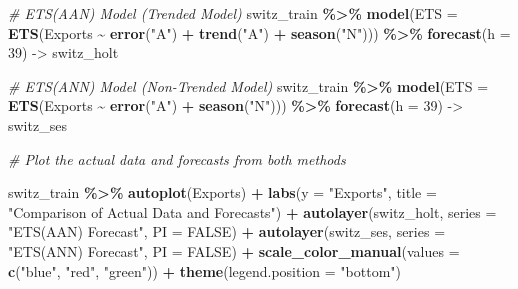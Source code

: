 \documentclass[
]{article}
\newenvironment{Shaded}{\begin{snugshade}}{\end{snugshade}}
\newcommand{\AttributeTok}[1]{\textcolor[rgb]{0.13,0.29,0.53}{#1}}
\newcommand{\CommentTok}[1]{\textcolor[rgb]{0.56,0.35,0.01}{\textit{#1}}}
\newcommand{\ConstantTok}[1]{\textcolor[rgb]{0.56,0.35,0.01}{#1}}
\newcommand{\DecValTok}[1]{\textcolor[rgb]{0.00,0.00,0.81}{#1}}
\newcommand{\FunctionTok}[1]{\textcolor[rgb]{0.13,0.29,0.53}{\textbf{#1}}}
\newcommand{\NormalTok}[1]{#1}
\newcommand{\OtherTok}[1]{\textcolor[rgb]{0.56,0.35,0.01}{#1}}
\newcommand{\SpecialCharTok}[1]{\textcolor[rgb]{0.81,0.36,0.00}{\textbf{#1}}}
\newcommand{\StringTok}[1]{\textcolor[rgb]{0.31,0.60,0.02}{#1}}
\begin{document}
\begin{Shaded}
\begin{Highlighting}[]
\CommentTok{\# ETS(AAN) Model (Trended Model)}
\NormalTok{switz\_train }\SpecialCharTok{\%\textgreater{}\%}
  \FunctionTok{model}\NormalTok{(}\AttributeTok{ETS =} \FunctionTok{ETS}\NormalTok{(Exports }\SpecialCharTok{\textasciitilde{}} \FunctionTok{error}\NormalTok{(}\StringTok{"A"}\NormalTok{) }\SpecialCharTok{+} \FunctionTok{trend}\NormalTok{(}\StringTok{"A"}\NormalTok{) }\SpecialCharTok{+} \FunctionTok{season}\NormalTok{(}\StringTok{"N"}\NormalTok{))) }\SpecialCharTok{\%\textgreater{}\%}
  \FunctionTok{forecast}\NormalTok{(}\AttributeTok{h =} \DecValTok{39}\NormalTok{) }\OtherTok{{-}\textgreater{}}\NormalTok{ switz\_holt}

\CommentTok{\# ETS(ANN) Model (Non{-}Trended Model)}
\NormalTok{switz\_train }\SpecialCharTok{\%\textgreater{}\%}
  \FunctionTok{model}\NormalTok{(}\AttributeTok{ETS =} \FunctionTok{ETS}\NormalTok{(Exports }\SpecialCharTok{\textasciitilde{}} \FunctionTok{error}\NormalTok{(}\StringTok{"A"}\NormalTok{) }\SpecialCharTok{+} \FunctionTok{season}\NormalTok{(}\StringTok{"N"}\NormalTok{))) }\SpecialCharTok{\%\textgreater{}\%}
  \FunctionTok{forecast}\NormalTok{(}\AttributeTok{h =} \DecValTok{39}\NormalTok{) }\OtherTok{{-}\textgreater{}}\NormalTok{ switz\_ses}

\CommentTok{\# Plot the actual data and forecasts from both methods}

\NormalTok{switz\_train }\SpecialCharTok{\%\textgreater{}\%}
  \FunctionTok{autoplot}\NormalTok{(Exports) }\SpecialCharTok{+}
  \FunctionTok{labs}\NormalTok{(}\AttributeTok{y =} \StringTok{"Exports"}\NormalTok{, }\AttributeTok{title =} \StringTok{"Comparison of Actual Data and Forecasts"}\NormalTok{) }\SpecialCharTok{+}
  \FunctionTok{autolayer}\NormalTok{(switz\_holt, }\AttributeTok{series =} \StringTok{"ETS(AAN) Forecast"}\NormalTok{, }\AttributeTok{PI =} \ConstantTok{FALSE}\NormalTok{) }\SpecialCharTok{+}
  \FunctionTok{autolayer}\NormalTok{(switz\_ses, }\AttributeTok{series =} \StringTok{"ETS(ANN) Forecast"}\NormalTok{, }\AttributeTok{PI =} \ConstantTok{FALSE}\NormalTok{) }\SpecialCharTok{+}
  \FunctionTok{scale\_color\_manual}\NormalTok{(}\AttributeTok{values =} \FunctionTok{c}\NormalTok{(}\StringTok{"blue"}\NormalTok{, }\StringTok{"red"}\NormalTok{, }\StringTok{"green"}\NormalTok{)) }\SpecialCharTok{+}
  \FunctionTok{theme}\NormalTok{(}\AttributeTok{legend.position =} \StringTok{"bottom"}\NormalTok{)}
\end{Highlighting}
\end{Shaded}
\end{document}
